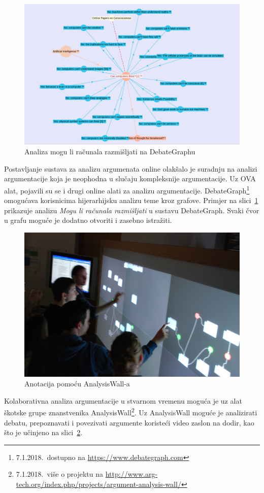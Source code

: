 \begin{figure}
\centering
\includegraphics[scale=0.4]{debategraph.png}
\caption{Analiza mogu li računala razmišljati na DebateGraphu}
\label{fig:computers}
\end{figure}

Postavljanje sustava za analizu argumenata online olakšalo je suradnju 
na analizi argumentacije koja je neophodna u slučaju kompleksnije
argumentacije. Uz OVA alat, pojavili su se i drugi online alati za
analizu argumentacije. DebateGraph\footnote{7.1.2018.\ dostupno na 
\url{https://www.debategraph.com}} omogućava korisnicima hijerarhijsku 
analizu teme kroz grafove. Primjer na slici~\ref{fig:computers} prikazuje
analizu \emph{Mogu li računala razmišljati} u sustavu DebateGraph. Svaki
čvor u grafu moguće je dodatno otvoriti i zasebno istražiti. 

\begin{figure}
\centering
\includegraphics[scale=0.4]{analysis_wall.jpg}
\caption{Anotacija pomoću AnalysisWall-a}
\label{fig:analysiswall}
\end{figure}

Kolaborativna analiza argumentacije u stvarnom vremenu moguća je uz alat 
škotske grupe znanstvenika
AnalysisWall\footnote{7.1.2018.\ više o projektu na \url{http://www.arg-tech.org/index.php/projects/argument-analysis-wall/}}.
Uz AnalysisWall moguće je analizirati debatu, prepoznavati i povezivati argumente 
koristeći video zaslon na dodir, kao što je učinjeno na slici~\ref{fig:analysiswall}.
